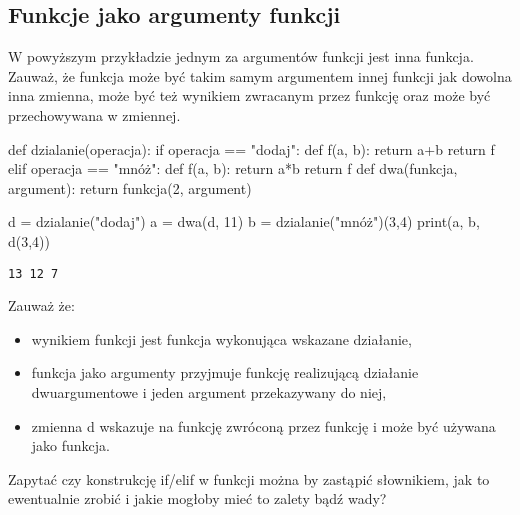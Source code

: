 \subsection{Funkcje jako argumenty funkcji {\Symbola 🤔}}\label{Funkcje_jako_argumenty}

W powyższym przykładzie jednym za argumentów funkcji  jest inna funkcja.
Zauważ, że funkcja może być takim samym argumentem innej funkcji jak dowolna inna zmienna,
może być też wynikiem zwracanym przez funkcję oraz może być przechowywana w zmiennej.

\begin{CodeFrame}[python]{0.50\textwidth}
def dzialanie(operacja):
    if operacja == "dodaj":
        def f(a, b):
            return a+b
        return f
    elif operacja == "mnóż":
        def f(a, b):
            return a*b
        return f
def dwa(funkcja, argument):
    return funkcja(2, argument)

d = dzialanie("dodaj")
a = dwa(d, 11)
b = dzialanie("mnóż")(3,4)
print(a, b, d(3,4))
\end{CodeFrame}
\begin{minipage}[t]{0.46\textwidth}
\begin{Verbatim}[frame=single]
13 12 7
\end{Verbatim}

\vspace{6pt}\noindent Zauważ że:
\begin{itemize}[leftmargin=7mm]
\item wynikiem funkcji  jest funkcja wykonująca wskazane działanie,
\item funkcja  jako argumenty przyjmuje funkcję realizującą działanie dwuargumentowe i jeden argument przekazywany do niej,
\item zmienna d wskazuje na funkcję zwróconą przez funkcję  i może być używana jako funkcja.
\end{itemize}
\end{minipage}

\begin{teacherOnly}
Zapytać czy konstrukcję if/elif w funkcji  można by zastąpić słownikiem, jak to ewentualnie zrobić i jakie mogłoby mieć to zalety bądź wady?

\end{teacherOnly}
